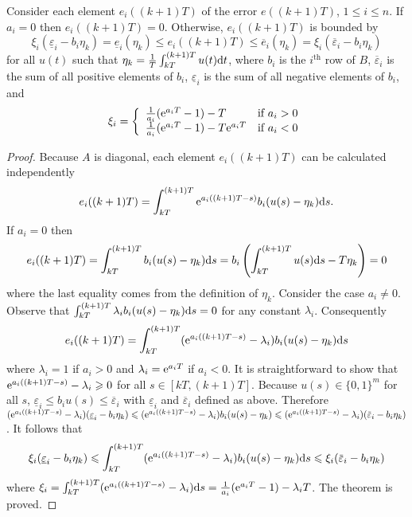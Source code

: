 \begin{theorem}
  \label{thm:averaged-sys-bound}Consider each element $e_i ((k + 1) T)$ of the
  error $e ((k + 1) T)$, $1 \leqslant i \leqslant n$. If $a_i = 0$ then $e_i
  ((k + 1) T) = 0$. Otherwise, $e_i ((k + 1) T)$ is bounded by
  \[ \xi_i  (\underline{\varepsilon}_i - b_i \eta_k) = \underline{e}_i
     (\eta_k) \leqslant e_i ((k + 1) T) \leqslant \overbar{e}_i (\eta_k) =
     \xi_i  (\overbar{\varepsilon}_i - b_i \eta_k) \]
  for all $u (t)$ such that $\eta_k = \frac{1}{T} \int_{kT}^{(k + 1) T} u (t)
  \mathrm{d} t$, where $b_i$ is the $i^{\text{th}}$ row of $B$,
  $\overbar{\varepsilon}_i$ is the sum of all positive elements of $b_i$,
  $\underline{\varepsilon}_i$ is the sum of all negative elements of $b_i$,
  and
  \[ \xi_i = \left\{ \begin{array}{ll}
       \frac{1}{a_i} (\mathrm{e}^{a_i T} - 1) - T & \text{if } a_i > 0\\
       \frac{1}{a_i} (\mathrm{e}^{a_i T} - 1) - T \mathrm{e}^{a_i T} & \text{if } a_i
       < 0
     \end{array} \right._{} \]
\end{theorem}

\begin{proof}
  Because $A$ is diagonal, each element $e_i ((k + 1) T)$ can be calculated
  independently
  \[ e_i ((k + 1) T) = \int_{kT}^{(k + 1) T} \mathrm{e}^{a_i ((k + 1) T - s)} b_i 
     (u (s) - \eta_k) \mathrm{d} s \text{.} \]
  If $a_i = 0$ then
  \[ e_i ((k + 1) T) = \int_{kT}^{(k + 1) T} b_i  (u (s) - \eta_k) \mathrm{d} s =
     b_i  \left( \int_{kT}^{(k + 1) T} u (s) \mathrm{d} s - T \eta_k \right) = 0
  \]
  where the last equality comes from the definition of $\eta_k$. Consider the
  case $a_i \neq 0$. Observe that $\int_{kT}^{(k + 1) T} \lambda_i b_i  (u (s)
  - \eta_k) \mathrm{d} s = 0$ for any constant $\lambda_i$. Consequently
  \[ e_i ((k + 1) T) = \int_{kT}^{(k + 1) T} (\mathrm{e}^{a_i ((k + 1) T - s)} -
     \lambda_i ) b_i  (u (s) - \eta_k) \mathrm{d} s \]
  where $\lambda_i = 1$ if $a_i > 0$ and $\lambda_i = \mathrm{e}^{a_i T}$ if $a_i
  < 0$. It is straightforward to show that $\mathrm{e}^{a_i ((k + 1) T - s)} -
  \lambda_i \geqslant 0$ for all $s \in [kT, (k + 1) T]$. Because $u (s) \in
  \{ 0, 1 \}^m$ for all $s$, $\underline{\varepsilon}_i \leqslant b_i u (s)
  \leqslant \overbar{\varepsilon}_i$ with $\underline{\varepsilon}_i$ and
  $\overbar{\varepsilon}_i$ defined as above. Therefore $(\mathe^{a_i ((k +
  1) T - s)} - \lambda_i )  (\underline{\varepsilon}_i - b_i \eta_k) \leqslant
  (\mathe^{a_i ((k + 1) T - s)} - \lambda_i ) b_i  (u (s) - \eta_k) \leqslant
  (\mathe^{a_i ((k + 1) T - s)} - \lambda_i )  (\overbar{\varepsilon}_i - b_i
  \eta_k)$. It follows that
  \[ \xi_i  (\underline{\varepsilon}_i - b_i \eta_k) \leqslant \int_{kT}^{(k +
     1) T} (\mathe^{a_i ((k + 1) T - s)} - \lambda_i ) b_i  (u (s) - \eta_k)
     \mathd s \leqslant \xi_i  (\overbar{\varepsilon}_i - b_i \eta_k) \]
  where $\xi_i = \int_{kT}^{(k + 1) T} (\mathrm{e}^{a_i ((k + 1) T - s)} -
  \lambda_i ) \mathrm{d} s = \frac{1}{a_i} (\mathrm{e}^{a_i T} - 1) - \lambda_i T$.
  The theorem is proved.
\end{proof}

